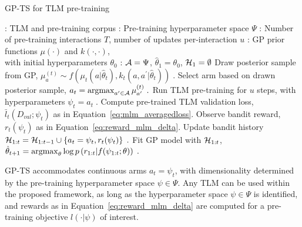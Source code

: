 \begin{algorithm}
	\caption{GP-TS for TLM pre-training}
	\label{alg:ts_pretrain_hyperparams}
	\begin{algorithmic}[1]
		: TLM and pre-training corpus
		: Pre-training hyperparameter space $\Psi$
		: Number of pre-training interactions $T$, number of updates per-interaction $u$
		: GP prior functions $\mu(\cdot)$ and $k(\cdot, \cdot)$, \\ with initial hyperparameters $\theta_0$		
		: $\mathcal{A}=\Psi$, $\hat{\theta}_1=\theta_0$, $\mathcal{H}_1=\emptyset$
		\STATE Draw posterior sample from GP, 
			$\mu_{a}^{(t)} \sim f(\mu_t(a|\hat{\theta}_t), k_t(a, a^\prime|\hat{\theta}_t)) \;.$
		\STATE Select arm based on drawn posterior sample, 
			$a_{t}=\mathop{\mathrm{argmax}}_{a^\prime \in \mathcal{A}} \mu_{a^\prime}^{(t)} \;.$
		\STATE Run TLM pre-training for $u$ steps, with hyperparameters $\psi_t=a_t \;.$
		\STATE Compute pre-trained TLM validation loss, 
			$\bar{l}_t(D_{val};\psi_t)$ as in Equation~\eqref{eq:mlm_averagedloss}.
		\STATE Observe bandit reward, 
			$r_{t}(\psi_t)$ as in Equation~\eqref{eq:reward_mlm_delta}.
		\STATE Update bandit history 
			$\mathcal{H}_{1:t}=\mathcal{H}_{1:t-1} \cup \left\{a_{t}=\psi_t, r_{t}(\psi_t)\right\} \;.$
		\STATE Fit GP model with $\mathcal{H}_{1:t}$, 
			$\hat{\theta}_{t+1} =\mathop{\mathrm{argmax}}_{\theta} \log p\left(r_{1:t}|f(\psi_{1:t} ; \theta) \right) \;.$
		\ENDFOR
	\end{algorithmic}
\end{algorithm}

GP-TS accommodates continuous arms $a_t=\psi_t$,
with dimensionality determined by the pre-training hyperparameter space $\psi \in \Psi$.
Any TLM can be used within the proposed framework,
as long as the hyperparameter space $\psi \in \Psi$ is identified,
and rewards as in Equation~\eqref{eq:reward_mlm_delta} are computed for a pre-training objective $l(\cdot|\psi)$ of interest.

